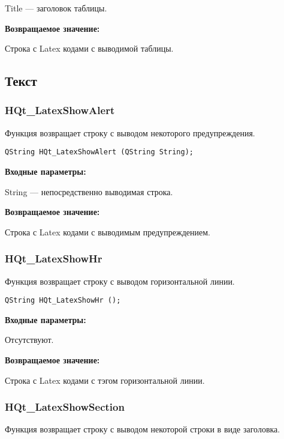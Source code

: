\documentclass[a4paper,12pt]{article}
\begin{document}
    Title --- заголовок таблицы.

\textbf{Возвращаемое значение:}

Строка с Latex кодами с выводимой таблицы.


\subsection{Текст}

\subsubsection{HQt\_LatexShowAlert}\label{HQt_LatexShowAlert}

Функция возвращает строку с выводом некоторого предупреждения.


\begin{lstlisting}[label=code_syntax_HQt_LatexShowAlert,caption=Синтаксис]
QString HQt_LatexShowAlert (QString String);
\end{lstlisting}

\textbf{Входные параметры:}

String --- непосредственно выводимая строка.

\textbf{Возвращаемое значение:}

Строка с Latex кодами с выводимым предупреждением.


\subsubsection{HQt\_LatexShowHr}\label{HQt_LatexShowHr}

Функция возвращает строку с выводом горизонтальной линии.


\begin{lstlisting}[label=code_syntax_HQt_LatexShowHr,caption=Синтаксис]
QString HQt_LatexShowHr ();
\end{lstlisting}

\textbf{Входные параметры:}

Отсутствуют.

\textbf{Возвращаемое значение:}

Строка с Latex кодами с тэгом горизонтальной линии.


\subsubsection{HQt\_LatexShowSection}\label{HQt_LatexShowSection}

Функция возвращает строку с выводом некоторой строки в виде заголовка.
\end{document}
